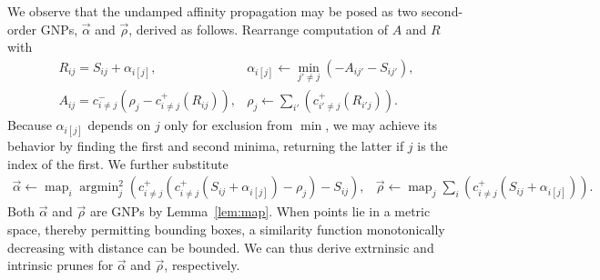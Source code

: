 \documentclass{article}
\DeclareMathOperator*{\argmin}{argmin}
\DeclareMathOperator*{\map}{map}
\newcommand{\ocpos}[1]{c^{+}_{#1}}
\newcommand{\ocneg}[1]{c^{-}_{#1}}
\newcommand{\cpos}[2]{\ocpos{#1 \neq #2}}
\newcommand{\cneg}[2]{\ocneg{#1 \neq #2}}
\newcommand{\respo}[2]{R_{#1#2}}
\newcommand{\avail}[2]{A_{#1#2}}
\newcommand{\simil}[2]{S_{#1#2}}
\newcommand{\vecrho}{\vec{\rho}}
\newcommand{\vecalpha}{\vec{\alpha}}
\newcommand{\frho}[1]{\rho_{#1}}
\newcommand{\falphaj}[2]{\alpha_{#1[#2]}}
\begin{document}
We observe that the undamped affinity propagation may be posed as two second-order GNPs, $\vecalpha$ and $\vecrho$, derived as follows.
Rearrange computation of $A$ and $R$ with
\[ \begin{array}{ll}
    \respo{i}{j} = \simil{i}{j} + \falphaj{i}{j}, & \falphaj{i}{j} \gets \min_{j' \neq j} (-\avail{i}{j'} - \simil{i}{j'}), \\
    \avail{i}{j} = \cneg{i}{j} (\frho{j} - \cpos{i}{j}(\respo{i}{j}) ), & \frho{j} \gets \sum_{i'} ( \cpos{i'}{j}(\respo{i'}{j}) ) .
\end{array} \]
Because $\falphaj{i}{j}$ depends on $j$ only for exclusion from $\min$, we may achieve its behavior by finding the first and second minima, returning the latter if $j$ is the index of the first.
We further substitute
\[ \begin{array}{rcl}
  \vecalpha \gets \map_{i} \argmin^2_{j} \!\left( \cpos{i}{j}(\cpos{i}{j}(\simil{i}{j} + \falphaj{i}{j}) - \frho{j}) - \simil{i}{j} \right)\! ,
  &
  \vecrho \gets \map_{j} \sum_{i} \!\left( \cpos{i}{j}(\simil{i}{j} + \falphaj{i}{j}) \right)\! .
\end{array} \]
Both $\vecalpha$ and $\vecrho$ are GNPs by Lemma~\ref{lem:map}.
When points lie in a metric space, thereby permitting bounding boxes, a similarity function monotonically decreasing with distance can be bounded.
We can thus derive extrninsic and intrinsic prunes for $\vecalpha$ and $\vecrho$, respectively.
\end{document}
